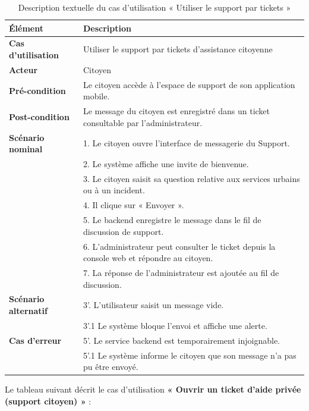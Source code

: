 \begin{table}[H]
    \centering
    \caption{Description textuelle du cas d'utilisation « Utiliser le support par tickets »}
    \label{tab:txt_support_tickets}
    \vspace{0.2cm}
    \small
    \begin{tabularx}{\textwidth}{|l|X|}
        \hline
        \textbf{Élément} & \textbf{Description} \\ \hline
        \textbf{Cas d’utilisation} & Utiliser le support par tickets d'assistance citoyenne \\ \hline
        \textbf{Acteur} & Citoyen \\ \hline
        \textbf{Pré-condition} & Le citoyen accède à l'espace de support de son application mobile. \\ \hline
        \textbf{Post-condition} & Le message du citoyen est enregistré dans un ticket consultable par l'administrateur. \\ \hline
        \textbf{Scénario nominal} &
        1. Le citoyen ouvre l'interface de messagerie du Support.\\
        & 2. Le système affiche une invite de bienvenue.\\
        & 3. Le citoyen saisit sa question relative aux services urbains ou à un incident.\\
        & 4. Il clique sur « Envoyer ».\\
        & 5. Le backend enregistre le message dans le fil de discussion de support.\\
        & 6. L'administrateur peut consulter le ticket depuis la console web et répondre au citoyen.\\
        & 7. La réponse de l'administrateur est ajoutée au fil de discussion. \\ \hline
        \textbf{Scénario alternatif} &
        3'. L'utilisateur saisit un message vide.\\
        & 3'.1 Le système bloque l'envoi et affiche une alerte. \\ \hline
        \textbf{Cas d’erreur} &
        5'. Le service backend est temporairement injoignable.\\
        & 5'.1 Le système informe le citoyen que son message n'a pas pu être envoyé. \\ \hline
    \end{tabularx}
\end{table}

Le tableau suivant décrit le cas d'utilisation \textbf{« Ouvrir un ticket d'aide privée (support citoyen) »} :

